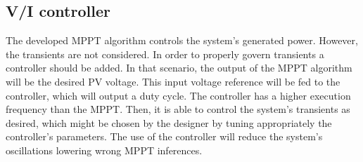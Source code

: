 
\subsection{V/I controller}
The developed MPPT algorithm controls the system's generated power. However, the transients are not considered. In order to properly govern transients a controller should be added. In that scenario, the output of the MPPT algorithm will be the desired PV voltage. This input voltage reference will be fed to the controller, which will output a duty cycle. The controller has a higher execution frequency than the MPPT. Then, it is able to control the system's transients as desired, which might be chosen by the designer by tuning appropriately the controller's parameters. The use of the controller will reduce the system's oscillations lowering wrong MPPT inferences. 
